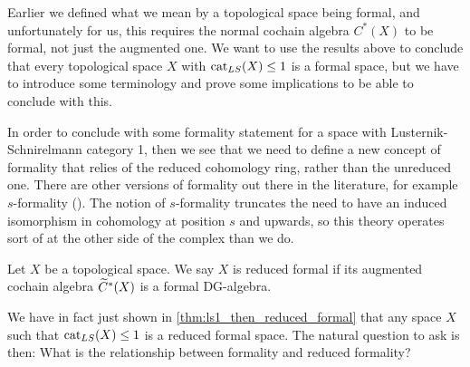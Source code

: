 Earlier we defined what we mean by a topological space being formal, and unfortunately for us, this requires the normal cochain algebra $C^*(X)$ to be formal, not just the augmented one. We want to use the results above to conclude that every topological space $X$ with $\text{cat}_{LS}(X)\leq 1$ is a formal space, but we have to introduce some terminology and prove some implications to be able to conclude with this. 

In order to conclude with some formality statement for a space with Lusternik-Schnirelmann category 1, then we see that we need to define a new concept of formality that relies of the reduced cohomology ring, rather than the unreduced one. There are other versions of formality out there in the literature, for example $s$-formality (\cite{sformality}). The notion of $s$-formality truncates the need to have an induced isomorphism in cohomology at position $s$ and upwards, so this theory operates sort of at the other side of the complex than we do. 

\begin{definition}
Let $X$ be a topological space. We say $X$ is reduced formal if its augmented cochain algebra $\widetilde{C}^*(X)$ is a formal DG-algebra. 
\end{definition}

We have in fact just shown in \ref{thm:ls1_then_reduced_formal} that any space $X$ such that $\text{cat}_{LS}(X)\leq 1$ is a reduced formal space. The natural question to ask is then: What is the relationship between formality and reduced formality? 

